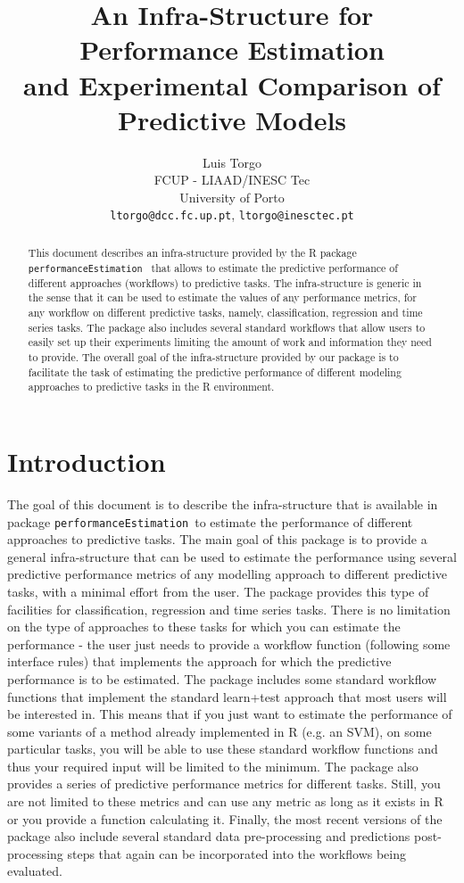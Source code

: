 \documentclass[10pt,a4paper]{article}\usepackage[]{graphicx}\usepackage[]{color}
\author{Luis Torgo\\FCUP - LIAAD/INESC Tec\\University of Porto\\
  \texttt{ltorgo@dcc.fc.up.pt}, \texttt{ltorgo@inesctec.pt}}
\title{An Infra-Structure for Performance Estimation\\ and Experimental Comparison of Predictive Models}
\newcommand{\PE}{package \texttt{performanceEstimation}\ }
\begin{document}
\maketitle

\begin{abstract}
  
  This document describes an infra-structure provided by the R \PE
  that allows to estimate the predictive performance of different
  approaches (workflows) to predictive tasks.  The infra-structure is
  generic in the sense that it can be used to estimate the values of
  any performance metrics, for any workflow on different predictive
  tasks, namely, classification, regression and time series tasks. The
  package also includes several standard workflows that allow users to
  easily set up their experiments limiting the amount of work and
  information they need to provide. The overall goal of the
  infra-structure provided by our package is to facilitate the task of
  estimating the predictive performance of different modeling
  approaches to predictive tasks in the R environment.
   
\end{abstract}

\section{Introduction}

The goal of this document is to describe the infra-structure that is
available in \PE to estimate the performance of different approaches
to predictive tasks.  The main goal of this package is to provide a
general infra-structure that can be used to estimate the performance
using several predictive performance metrics of any modelling approach
to different predictive tasks, with a minimal effort from the
user. The package provides this type of facilities for classification,
regression and time series tasks. There is no limitation on the type
of approaches to these tasks for which you can estimate the
performance - the user just needs to provide a workflow function
(following some interface rules) that implements the approach for
which the predictive performance is to be estimated. The package
includes some standard workflow functions that implement the standard
learn+test approach that most users will be interested
in. This means that if you just want to estimate the performance of
some variants of a method already implemented in R (e.g. an SVM), on
some particular tasks, you will be able to use these standard workflow
functions and thus your required input will be limited to the minimum. The
package also provides a series of predictive performance metrics for
different tasks. Still, you are not limited to these metrics and can
use any metric as long as it exists in R or you provide a function
calculating it. Finally, the most recent versions of the package also
include several standard data pre-processing and predictions
post-processing steps that again can be incorporated into the
workflows being evaluated.  
\end{document}
